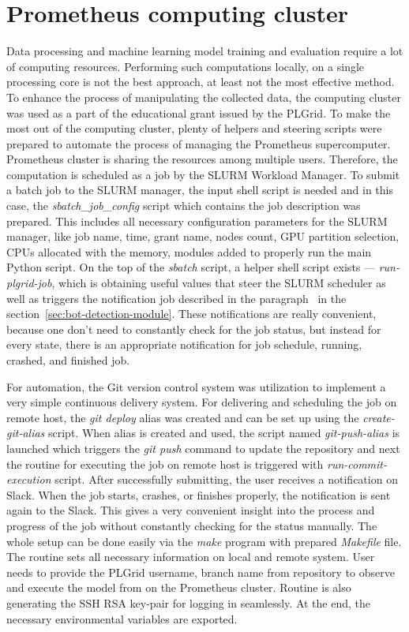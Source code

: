 \section{Prometheus computing cluster}\label{sec:prometheus-computing-cluster}
Data processing and machine learning model training and evaluation require a lot of computing resources.
Performing such computations locally, on a single processing core is not the best approach, at least not the most effective method.
To enhance the process of manipulating the collected data, the computing cluster was used as a part of the educational grant issued by the PLGrid.
To make the most out of the computing cluster, plenty of helpers and steering scripts were prepared to automate the process of managing the Prometheus supercomputer.
Prometheus cluster is sharing the resources among multiple users.
Therefore, the computation is scheduled as a job by the SLURM Workload Manager.
To submit a batch job to the SLURM manager, the input shell script is needed and in this case, the \textit{sbatch\_job\_config} script which contains the job description was prepared.
This includes all necessary configuration parameters for the SLURM manager, like job name, time, grant name, nodes count, GPU partition selection, CPUs allocated with the memory, modules added to properly run the main Python script.
On the top of the \textit{sbatch} script, a helper shell script exists --- \textit{run-plgrid-job}, which is obtaining useful values that steer the SLURM scheduler as well as triggers the notification job described in the paragraph~ in the section~\ref{sec:bot-detection-module}.
These notifications are really convenient, because one don't need to constantly check for the job status, but instead for every state, there is an appropriate notification for job schedule, running, crashed, and finished job.


For automation, the Git version control system was utilization to implement a very simple continuous delivery system.
For delivering and scheduling the job on remote host, the \textit{git deploy} alias was created and can be set up using the \textit{create-git-alias} script.
When alias is created and used, the script named \textit{git-push-alias} is launched which triggers the \textit{git push} command to update the repository and next the routine for executing the job on remote host is triggered with \textit{run-commit-execution} script.
After successfully submitting, the user receives a notification on Slack.
When the job starts, crashes, or finishes properly, the notification is sent again to the Slack.
This gives a very convenient insight into the process and progress of the job without constantly checking for the status manually.
The whole setup can be done easily via the \textit{make} program with prepared \textit{Makefile} file.
The routine sets all necessary information on local and remote system.
User needs to provide the PLGrid username, branch name from repository to observe and execute the model from on the Prometheus cluster.
Routine is also generating the SSH RSA key-pair for logging in seamlessly.
At the end, the necessary environmental variables are exported.
